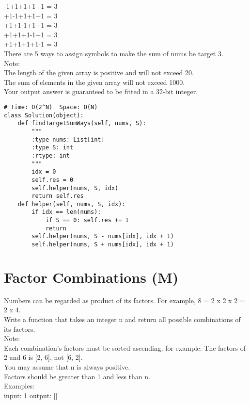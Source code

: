 -1+1+1+1+1 = 3\\
+1-1+1+1+1 = 3\\
+1+1-1+1+1 = 3\\
+1+1+1-1+1 = 3\\
+1+1+1+1-1 = 3\\

There are 5 ways to assign symbols to make the sum of nums be target 3.\\

Note:\\

    The length of the given array is positive and will not exceed 20.\\
    The sum of elements in the given array will not exceed 1000.\\
    Your output answer is guaranteed to be fitted in a 32-bit integer.\\

\begin{lstlisting}
# Time: O(2^N)  Space: O(N)
class Solution(object):
    def findTargetSumWays(self, nums, S):
        """
        :type nums: List[int]
        :type S: int
        :rtype: int
        """
        idx = 0
        self.res = 0
        self.helper(nums, S, idx)
        return self.res
    def helper(self, nums, S, idx):
        if idx == len(nums):
            if S == 0: self.res += 1
            return
        self.helper(nums, S - nums[idx], idx + 1)
        self.helper(nums, S + nums[idx], idx + 1)
\end{lstlisting}
     
\section{Factor Combinations (M)}
Numbers can be regarded as product of its factors. For example, 8 = 2 x 2 x 2 = 2 x 4.\\

Write a function that takes an integer n and return all possible combinations of its factors.\\

Note: \\
    Each combination's factors must be sorted ascending, for example: The factors of 2 and 6 is [2, 6], not [6, 2].\\
    You may assume that n is always positive.\\
    Factors should be greater than 1 and less than n.\\

Examples: \\
input: 1
output: 
[]\\

